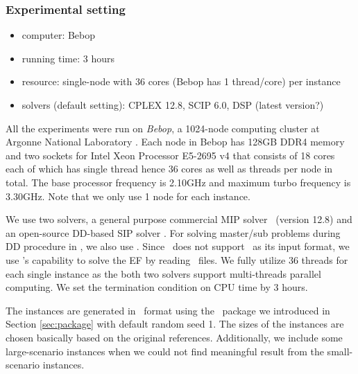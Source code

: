 \subsubsection{Experimental setting}
\begin{itemize}
	\item computer: Bebop
	\item running time: 3 hours
	\item resource: single-node with 36 cores (Bebop has 1 thread/core) per instance
	\item solvers (default setting): CPLEX 12.8, SCIP 6.0, DSP (latest version?)
\end{itemize}

All the experiments were run on \textit{Bebop}, a 1024-node computing cluster at Argonne National Laboratory \cite{bebop}. Each node in Bebop has 128GB DDR4 memory and two sockets for Intel Xeon Processor E5-2695 v4 that consists of 18 cores each of which has single thread hence 36 cores as well as threads per node in total. The base processor frequency is 2.10GHz and maximum turbo frequency is 3.30GHz. Note that we only use 1 node for each instance.

We use two solvers, a general purpose commercial MIP solver \cplex\ (version 12.8) and an open-source DD-based SIP solver \dsp. For solving master/sub problems during DD procedure in \dsp, we also use \cplex. Since \cplex\ does not support \smps\ as its input format, we use \dsp's capability to solve the EF by reading \smps\ files. We fully utilize 36 threads for each single instance as the both two solvers support multi-threads parallel computing. We set the termination condition on CPU time by 3 hours. 

The instances are generated in \smps\ format using the \julia\ package we introduced in Section \ref{sec:package} with default random seed 1. The sizes of the instances are chosen basically based on the original references. Additionally, we include some large-scenario instances when we could not find meaningful result from the small-scenario instances.

